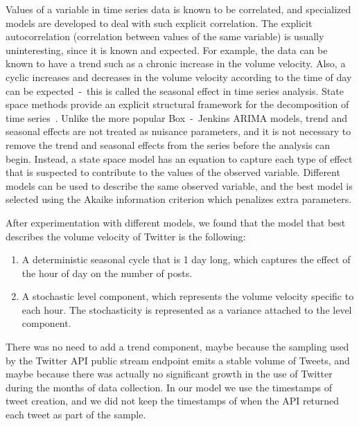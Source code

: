 \documentclass[letterpaper,12pt,titlepage,oneside,final]{book}
\begin{document}
Values of a variable in time series data is known to be correlated,
and specialized models are developed to deal with such explicit correlation.
The explicit autocorrelation (correlation between values of the same variable) is usually uninteresting, 
since it is known and expected.
For example, the data can be known to have a trend such as a chronic increase in the volume velocity. %
Also, a cyclic increases and decreases in the volume velocity according to the time of day can be expected~-~this is called the seasonal effect in time series analysis.
State space methods provide an explicit structural framework for the decomposition of time series~\cite{commandeur2007introduction}.
Unlike the more popular Box~-~Jenkins ARIMA models, 
trend and seasonal effects are not treated as nuisance parameters, 
and it is not necessary to remove the trend and seasonal effects 
from the series before the analysis can begin.
Instead, a state space model has an equation 
to capture each type of effect that is suspected
to contribute to the values of the observed variable.
Different models can be used to describe the same
observed variable, and the best model is
selected using the Akaike information criterion 
which penalizes extra parameters.

After experimentation with different models,
we found that the model that best describes the 
volume velocity of Twitter is the following: %
\begin{enumerate}
\item A deterministic seasonal cycle that is 1 day long, which captures the effect of the hour of day on the number of posts. 
\item A stochastic level component, which represents the volume velocity specific to each hour. The stochasticity is represented as a variance attached to the level component.
\end{enumerate}
There was no need to add a trend component,
maybe because the sampling used by the Twitter API %
public stream endpoint emits a stable volume of Tweets, 
and maybe because there was actually no significant growth in the 
use of Twitter during the months of data collection.
In our model we use the timestamps of tweet creation,
and we did not keep the timestamps of when the API returned
each tweet as part of the sample. %
\end{document}
